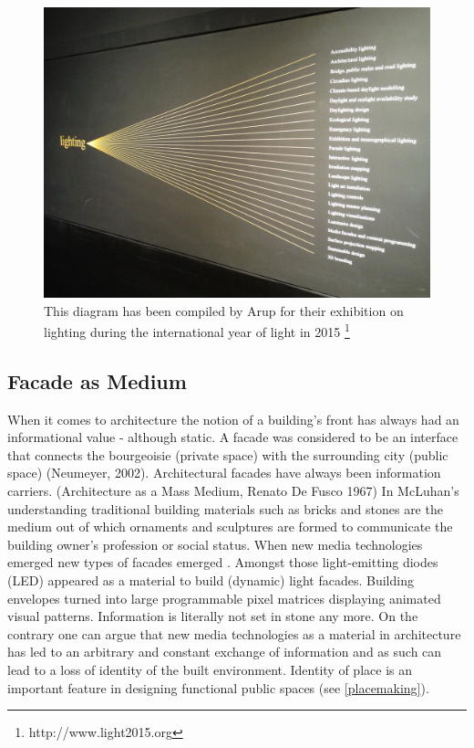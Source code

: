 \begin{figure} [h!]
    \centering
        \includegraphics[width=12cm]{Illustrations/Architectural-Lighting-Fields.jpg}
    \caption[Fields of Architectural Lighting]{This diagram has been compiled by Arup for their exhibition on lighting during the international year of light in 2015 \footnote{http://www.light2015.org} }
    \label{InterfacingArchitecture}
\end{figure}



\subsection{Facade as Medium}

When it comes to architecture the notion of a building's front has always had an informational value - although static. A facade was considered to be an interface that connects the bourgeoisie (private space) with the surrounding city (public space) (Neumeyer, 2002). Architectural facades  have always been information carriers. (Architecture as a Mass Medium,  Renato De Fusco 1967)
In McLuhan's understanding traditional building materials such as bricks and stones are the medium out of which ornaments and sculptures are formed to communicate the building owner's profession or social status. 
When new media technologies emerged new types of facades emerged \cite{Haeusler2009}. Amongst those light-emitting diodes (LED) appeared as a material to build (dynamic) light facades. 
Building envelopes turned into large programmable pixel matrices displaying animated visual patterns. Information is literally not set in stone any more. 
On the contrary one can argue that new media technologies as a material in architecture has led to an arbitrary and constant exchange of information and as such can lead to a loss of identity of the built environment. Identity of place is an important feature in designing functional public spaces (see \ref{placemaking}). 

